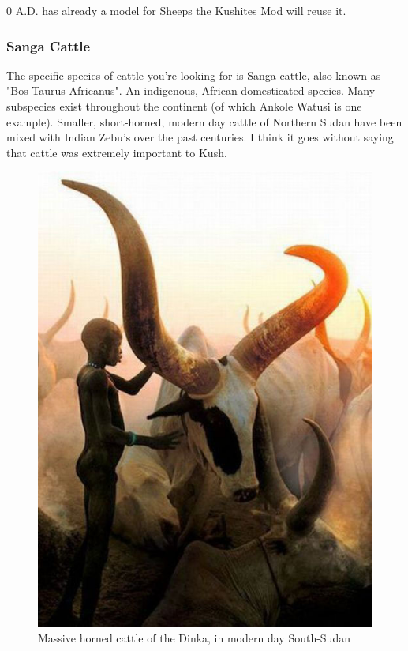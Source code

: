 \documentclass[a4paper,12pt]{scrreprt}
\begin{document}
0 A.D. has already a model for Sheeps the Kushites Mod will reuse it.

\subsubsection{Sanga Cattle}

The specific species of cattle you're looking for is Sanga cattle, also known as "Bos Taurus Africanus". An indigenous, African-domesticated species. Many subspecies exist throughout the continent (of which Ankole Watusi is one example). Smaller, short-horned, modern day cattle of Northern Sudan have been mixed with Indian Zebu's over the past centuries. I think it goes without saying that cattle was extremely important to Kush.\\

\begin{figure}[H]
	\centering
	\includegraphics[width=\textwidth]{img/corral/sanga_cattle_dinka}
	\caption{Massive horned cattle of the Dinka, in modern day South-Sudan}
\end{figure}
\end{document}
